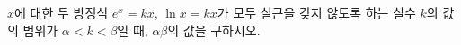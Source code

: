 $x$에 대한 두 방정식 $e^x=kx$, $\ln x=kx$가 모두 실근을 갖지 않도록 하는 실수 $k$의 값의 범위가 $\alpha<k<\beta$일 때, $\alpha\beta$의 값을 구하시오.
